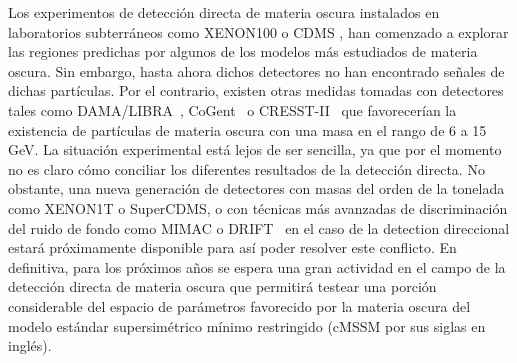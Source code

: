Los experimentos de detección directa de materia oscura instalados en
laboratorios subterráneos como XENON100 \cite{Aprile:2011ts}
o CDMS \cite{Ahmed:2009zw,Ahmed:2010wy}, han
comenzado a explorar las regiones predichas por algunos de los modelos
más estudiados de materia oscura.
Sin embargo, hasta ahora dichos detectores no han encontrado señales
de dichas partículas. Por el contrario, existen otras medidas tomadas
con detectores tales como DAMA/LIBRA~\cite{Bernabei:2010mq},
CoGent~\cite{Aalseth:2011wp} o CRESST-II~\cite{Angloher:2011uu} que
favorecerían la existencia de partículas de materia oscura con una masa
en el rango de 6 a 15 GeV.
La situación experimental está lejos de ser sencilla, ya que por el momento
no es claro cómo conciliar los diferentes resultados de la detección directa.
No obstante, una nueva generación de detectores con masas del orden de la
tonelada como XENON1T o SuperCDMS, o con técnicas más avanzadas de
discriminación del ruido de fondo como MIMAC \cite{Billard:2011yf}
o DRIFT~\cite{Pipe:2010zz} en el caso de la detection direccional estará
próximamente disponible para así poder resolver este conflicto.
En definitiva, para los próximos años se espera una gran actividad en
el campo de la detección directa de materia oscura que permitirá
testear una porción considerable del espacio de parámetros favorecido por
la materia oscura del modelo estándar supersimétrico mínimo restringido
(cMSSM por sus siglas en inglés).\\ 

